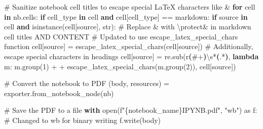 \documentclass[
  11pt,
  letterpaper,
]{book}
\newenvironment{Shaded}{\begin{snugshade}}{\end{snugshade}}
\newcommand{\BuiltInTok}[1]{\textcolor[rgb]{0.00,0.23,0.31}{#1}}
\newcommand{\CommentTok}[1]{\textcolor[rgb]{0.37,0.37,0.37}{#1}}
\newcommand{\ControlFlowTok}[1]{\textcolor[rgb]{0.00,0.23,0.31}{\textbf{#1}}}
\newcommand{\DecValTok}[1]{\textcolor[rgb]{0.68,0.00,0.00}{#1}}
\newcommand{\ImportTok}[1]{\textcolor[rgb]{0.00,0.46,0.62}{#1}}
\newcommand{\KeywordTok}[1]{\textcolor[rgb]{0.00,0.23,0.31}{\textbf{#1}}}
\newcommand{\NormalTok}[1]{\textcolor[rgb]{0.00,0.23,0.31}{#1}}
\newcommand{\OperatorTok}[1]{\textcolor[rgb]{0.37,0.37,0.37}{#1}}
\newcommand{\SpecialCharTok}[1]{\textcolor[rgb]{0.37,0.37,0.37}{#1}}
\newcommand{\SpecialStringTok}[1]{\textcolor[rgb]{0.13,0.47,0.30}{#1}}
\newcommand{\StringTok}[1]{\textcolor[rgb]{0.13,0.47,0.30}{#1}}
\newcommand{\VerbatimStringTok}[1]{\textcolor[rgb]{0.13,0.47,0.30}{#1}}
\begin{document}
\begin{Shaded}
\begin{Highlighting}[]
\CommentTok{\# Sanitize notebook cell titles to escape special LaTeX characters like \textquotesingle{}\&\textquotesingle{}}
\ControlFlowTok{for}\NormalTok{ cell }\KeywordTok{in}\NormalTok{ nb.cells:}
    \ControlFlowTok{if} \StringTok{\textquotesingle{}cell\_type\textquotesingle{}} \KeywordTok{in}\NormalTok{ cell }\KeywordTok{and}\NormalTok{ cell[}\StringTok{\textquotesingle{}cell\_type\textquotesingle{}}\NormalTok{] }\OperatorTok{==} \StringTok{\textquotesingle{}markdown\textquotesingle{}}\NormalTok{:}
        \ControlFlowTok{if} \StringTok{\textquotesingle{}source\textquotesingle{}} \KeywordTok{in}\NormalTok{ cell }\KeywordTok{and} \BuiltInTok{isinstance}\NormalTok{(cell[}\StringTok{\textquotesingle{}source\textquotesingle{}}\NormalTok{], }\BuiltInTok{str}\NormalTok{):}
            \CommentTok{\# Replace \textquotesingle{}\&\textquotesingle{} with \textquotesingle{}\textbackslash{}protect\&\textquotesingle{} in markdown cell titles AND CONTENT}
            \CommentTok{\# Updated to use escape\_latex\_special\_chars function}
\NormalTok{            cell[}\StringTok{\textquotesingle{}source\textquotesingle{}}\NormalTok{] }\OperatorTok{=}\NormalTok{ escape\_latex\_special\_chars(cell[}\StringTok{\textquotesingle{}source\textquotesingle{}}\NormalTok{])}
            \CommentTok{\# Additionally, escape special characters in headings}
\NormalTok{            cell[}\StringTok{\textquotesingle{}source\textquotesingle{}}\NormalTok{] }\OperatorTok{=}\NormalTok{ re.sub(}\VerbatimStringTok{r\textquotesingle{}}\KeywordTok{(}\VerbatimStringTok{\#}\OperatorTok{+}\KeywordTok{)}\DecValTok{\textbackslash{}s}\OperatorTok{*}\KeywordTok{(}\DecValTok{.}\OperatorTok{*}\KeywordTok{)}\VerbatimStringTok{\textquotesingle{}}\NormalTok{, }\KeywordTok{lambda}\NormalTok{ m: m.group(}\DecValTok{1}\NormalTok{) }\OperatorTok{+} \StringTok{\textquotesingle{} \textquotesingle{}} \OperatorTok{+}\NormalTok{ escape\_latex\_special\_chars(m.group(}\DecValTok{2}\NormalTok{)), cell[}\StringTok{\textquotesingle{}source\textquotesingle{}}\NormalTok{])}



\CommentTok{\# Convert the notebook to PDF}
\NormalTok{(body, resources) }\OperatorTok{=}\NormalTok{ exporter.from\_notebook\_node(nb)}


\CommentTok{\# Save the PDF to a file}
\ControlFlowTok{with} \BuiltInTok{open}\NormalTok{(}\SpecialStringTok{f"}\SpecialCharTok{\{}\NormalTok{notebook\_name}\SpecialCharTok{\}}\SpecialStringTok{IPYNB.pdf"}\NormalTok{, }\StringTok{"wb"}\NormalTok{) }\ImportTok{as}\NormalTok{ f:  }\CommentTok{\# Changed to \textquotesingle{}wb\textquotesingle{} for binary writing}
\NormalTok{    f.write(body)}
\end{Highlighting}
\end{Shaded}
\end{document}
